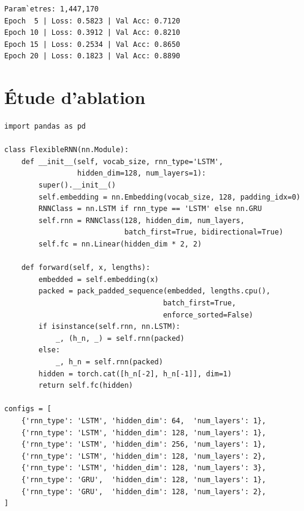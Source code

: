 \begin{codeoutput}
\begin{verbatim}
Param`etres: 1,447,170
Epoch  5 | Loss: 0.5823 | Val Acc: 0.7120
Epoch 10 | Loss: 0.3912 | Val Acc: 0.8210
Epoch 15 | Loss: 0.2534 | Val Acc: 0.8650
Epoch 20 | Loss: 0.1823 | Val Acc: 0.8890
\end{verbatim}
\end{codeoutput}

\section{\'Etude d'ablation}
\label{sec:rnn-ablation}

\begin{codeblock}[title=\textbf{Ablation : hidden size, couches, LSTM vs GRU}]
\begin{verbatim}
import pandas as pd

class FlexibleRNN(nn.Module):
    def __init__(self, vocab_size, rnn_type='LSTM',
                 hidden_dim=128, num_layers=1):
        super().__init__()
        self.embedding = nn.Embedding(vocab_size, 128, padding_idx=0)
        RNNClass = nn.LSTM if rnn_type == 'LSTM' else nn.GRU
        self.rnn = RNNClass(128, hidden_dim, num_layers,
                            batch_first=True, bidirectional=True)
        self.fc = nn.Linear(hidden_dim * 2, 2)

    def forward(self, x, lengths):
        embedded = self.embedding(x)
        packed = pack_padded_sequence(embedded, lengths.cpu(),
                                     batch_first=True,
                                     enforce_sorted=False)
        if isinstance(self.rnn, nn.LSTM):
            _, (h_n, _) = self.rnn(packed)
        else:
            _, h_n = self.rnn(packed)
        hidden = torch.cat([h_n[-2], h_n[-1]], dim=1)
        return self.fc(hidden)

configs = [
    {'rnn_type': 'LSTM', 'hidden_dim': 64,  'num_layers': 1},
    {'rnn_type': 'LSTM', 'hidden_dim': 128, 'num_layers': 1},
    {'rnn_type': 'LSTM', 'hidden_dim': 256, 'num_layers': 1},
    {'rnn_type': 'LSTM', 'hidden_dim': 128, 'num_layers': 2},
    {'rnn_type': 'LSTM', 'hidden_dim': 128, 'num_layers': 3},
    {'rnn_type': 'GRU',  'hidden_dim': 128, 'num_layers': 1},
    {'rnn_type': 'GRU',  'hidden_dim': 128, 'num_layers': 2},
]


\end{verbatim}
\end{codeblock}
